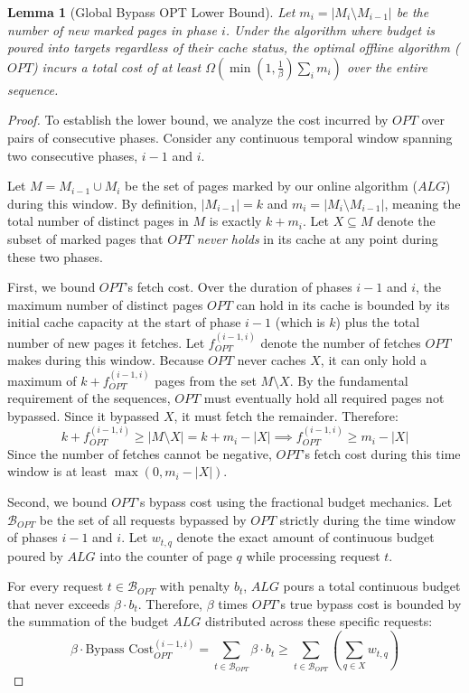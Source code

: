 \documentclass[a4paper]{article}
\newtheorem{lemma}{Lemma}      %
\begin{document}
\begin{lemma}[Global Bypass OPT Lower Bound]
\label{lemma:bypass_opt_bound}
Let $m_i = |M_i \setminus M_{i-1}|$ be the number of new marked pages in phase $i$. Under the algorithm where budget is poured into targets regardless of their cache status, the optimal offline algorithm ($OPT$) incurs a total cost of at least $\Omega\left(\min(1, \frac{1}{\beta}) \sum_i m_i\right)$ over the entire sequence.
\end{lemma}
\begin{proof}
To establish the lower bound, we analyze the cost incurred by $OPT$ over pairs of consecutive phases. Consider any continuous temporal window spanning two consecutive phases, $i-1$ and $i$. 

Let $M = M_{i-1} \cup M_i$ be the set of pages marked by our online algorithm ($ALG$) during this window. By definition, $|M_{i-1}| = k$ and $m_i = |M_i \setminus M_{i-1}|$, meaning the total number of distinct pages in $M$ is exactly $k + m_i$. Let $X \subseteq M$ denote the subset of marked pages that $OPT$ \textit{never holds} in its cache at any point during these two phases. 

First, we bound $OPT$'s fetch cost. Over the duration of phases $i-1$ and $i$, the maximum number of distinct pages $OPT$ can hold in its cache is bounded by its initial cache capacity at the start of phase $i-1$ (which is $k$) plus the total number of new pages it fetches. Let $f_{OPT}^{(i-1, i)}$ denote the number of fetches $OPT$ makes during this window. Because $OPT$ never caches $X$, it can only hold a maximum of $k + f_{OPT}^{(i-1, i)}$ pages from the set $M \setminus X$. By the fundamental requirement of the sequences, $OPT$ must eventually hold all required pages not bypassed. Since it bypassed $X$, it must fetch the remainder. Therefore:
$$ k + f_{OPT}^{(i-1, i)} \ge |M \setminus X| = k + m_i - |X| \implies f_{OPT}^{(i-1, i)} \ge m_i - |X| $$
Since the number of fetches cannot be negative, $OPT$'s fetch cost during this time window is at least $\max(0, m_i - |X|)$.

Second, we bound $OPT$'s bypass cost using the fractional budget mechanics. Let $\mathcal{B}_{OPT}$ be the set of all requests bypassed by $OPT$ strictly during the time window of phases $i-1$ and $i$. Let $w_{t,q}$ denote the exact amount of continuous budget poured by $ALG$ into the counter of page $q$ while processing request $t$.

For every request $t \in \mathcal{B}_{OPT}$ with penalty $b_t$, $ALG$ pours a total continuous budget that never exceeds $\beta \cdot b_t$. Therefore, $\beta$ times $OPT$'s true bypass cost is bounded by the summation of the budget $ALG$ distributed across these specific requests:
$$ \beta \cdot \text{Bypass Cost}_{OPT}^{(i-1, i)} = \sum_{t \in \mathcal{B}_{OPT}} \beta \cdot b_t \ge \sum_{t \in \mathcal{B}_{OPT}} \left( \sum_{q \in X} w_{t,q} \right) $$


\end{proof}
\end{document}
